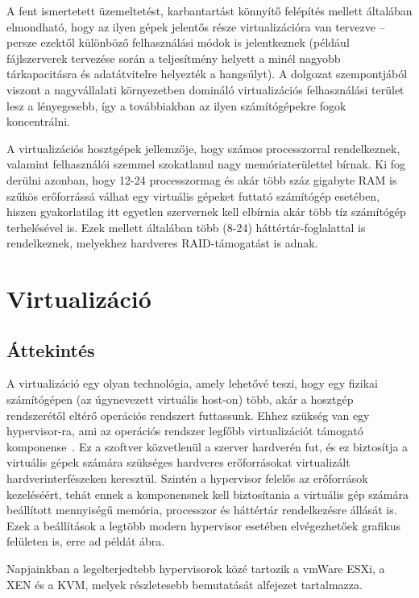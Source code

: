 A fent ismertetett üzemeltetést, karbantartást könnyítő felépítés mellett általában elmondható, hogy az ilyen gépek jelentős része virtualizációra van tervezve -- persze ezektől különböző felhasználási módok is jelentkeznek (például fájlszerverek tervezése során a teljesítmény helyett a minél nagyobb tárkapacitásra és adatátvitelre helyezték a hangsúlyt). A dolgozat szempontjából viszont a nagyvállalati környezetben domináló virtualizációs felhasználási terület lesz a lényegesebb, így a továbbiakban az ilyen számítógépekre fogok koncentrálni.

A virtualizációs hosztgépek jellemzője, hogy számos processzorral rendelkeznek, valamint felhasználói szemmel szokatlanul nagy memóriaterülettel bírnak. Ki fog derülni azonban, hogy 12-24 processzormag és akár több száz gigabyte RAM is szűkös erőforrássá válhat egy virtuális gépeket futtató számítógép esetében, hiszen gyakorlatilag itt egyetlen szervernek kell elbírnia akár több tíz számítógép terhelésével is. Ezek mellett általában több (8-24) háttértár-foglalattal is rendelkeznek, melyekhez hardveres RAID-támogatást is adnak.

\section{Virtualizáció}
\subsection{Áttekintés}
A virtualizáció egy olyan technológia, amely lehetővé teszi, hogy egy fizikai számítógépen (az úgynevezett virtuális host-on) több, akár a hosztgép rendszerétől eltérő operációs rendszert futtassunk. Ehhez szükség van egy \gls{hypervisor}-ra, ami az operációs rendszer legfőbb virtualizációt támogató komponense~\cite{Sles15virt}. Ez a szoftver közvetlenül a szerver hardverén fut, és ez biztosítja a virtuális gépek számára szükséges hardveres erőforrásokat virtualizált hardverinterfészeken keresztül. Szintén a \gls{hypervisor} felelős az erőforrások kezeléséért, tehát ennek a komponensnek kell biztosítania a virtuális gép számára beállított mennyiségű memória, processzor és háttértár rendelkezésre állását is. Ezek a beállítások a legtöbb modern \gls{hypervisor} esetében elvégezhetőek grafikus felületen is, erre ad példát  ábra.

Napjainkban a legelterjedtebb hypervisorok közé tartozik a vmWare ESXi, a XEN és a KVM, melyek részletesebb bemutatását  alfejezet tartalmazza.

